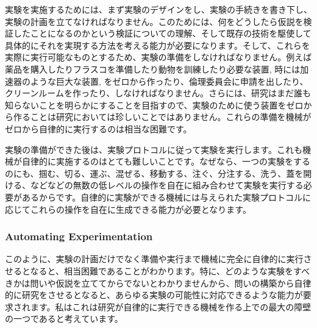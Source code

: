 実験を実施するためには、まず実験のデザインをし、実験の手続きを書き下し、実験の計画を立てなければなりません。このためには、何をどうしたら仮説を検証したことになるのかという検証についての理解、そして既存の技術を駆使して具体的にそれを実現する方法を考える能力が必要になります。そして、これらを実際に実行可能なものとするため、実験の準備をしなければなりません。例えば薬品を購入したりフラスコを準備したり動物を訓練したり必要な装置, 時には加速器のような巨大な装置, をゼロから作ったり、倫理委員会に申請を出したり、クリーンルームを作ったり、しなければなりません。さらには、研究はまだ誰も知らないことを明らかにすることを目指すので、実験のために使う装置をゼロから作ることは研究においては珍しいことではありません。これらの準備を機械がゼロから自律的に実行するのは相当な困難です。

実験の準備ができた後は、実験プロトコルに従って実験を実行します。これも機械が自律的に実施するのはとても難しいことです。なぜなら、一つの実験をするのにも、掴む、切る、運ぶ、混ぜる、移動する、注ぐ、分注する、洗う、蓋を開ける、などなどの無数の低レベルの操作を自在に組み合わせて実験を実行する必要があるからです。自律的に実験ができる機械には与えられた実験プロトコルに応じてこれらの操作を自在に生成できる能力が必要となります。


\subsubsection{Automating Experimentation}

このように、実験の計画だけでなく準備や実行まで機械に完全に自律的に実行させるとなると、相当困難であることがわかります。特に、どのような実験をすべきかは問いや仮説を立ててからでないとわかりませんから、問いの構築から自律的に研究をさせるとなると、あらゆる実験の可能性に対応できるような能力が要求されます。私はこれは研究が自律的に実行できる機械を作る上での最大の障壁の一つであると考えています。

